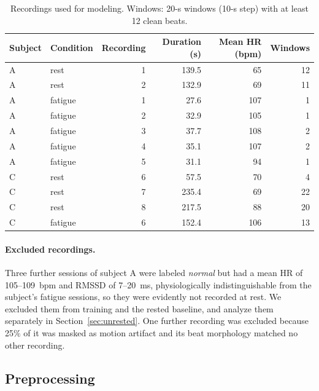 \documentclass[11pt]{article}
\newcommand{\rowband}{\rowcolors{2}{bblight}{white}}
\begin{document}
\begin{table}[h]
\centering
\caption{Recordings used for modeling. Windows: 20-s windows (10-s step) with at least 12 clean beats.}
\label{tab:data}
\rowband\begin{tabular}{llrrrr}
\toprule
Subject & Condition & Recording & Duration (s) & Mean HR (bpm) & Windows \\
\midrule
A & rest    & 1 & 139.5 & 65 & 12 \\
A & rest    & 2 & 132.9 & 69 & 11 \\
A & fatigue & 1 &  27.6 & 107 & 1 \\
A & fatigue & 2 &  32.9 & 105 & 1 \\
A & fatigue & 3 &  37.7 & 108 & 2 \\
A & fatigue & 4 &  35.1 & 107 & 2 \\
A & fatigue & 5 &  31.1 &  94 & 1 \\
\midrule
C & rest    & 6 &  57.5 & 70 &  4 \\
C & rest    & 7 & 235.4 & 69 & 22 \\
C & rest    & 8 & 217.5 & 88 & 20 \\
C & fatigue & 6 & 152.4 & 106 & 13 \\
\bottomrule
\end{tabular}
\end{table}

\paragraph{Excluded recordings.}
Three further sessions of subject A were labeled \emph{normal} but had a mean HR of 105--109~bpm and
RMSSD of 7--20~ms, physiologically indistinguishable from the subject's fatigue sessions, so they were
evidently not recorded at rest. We excluded them from training and the rested baseline, and analyze them
separately in Section~\ref{sec:unrested}. One further recording was excluded because 25\% of it was
masked as motion artifact and its beat morphology matched no other recording.

\subsection{Preprocessing}
\end{document}

